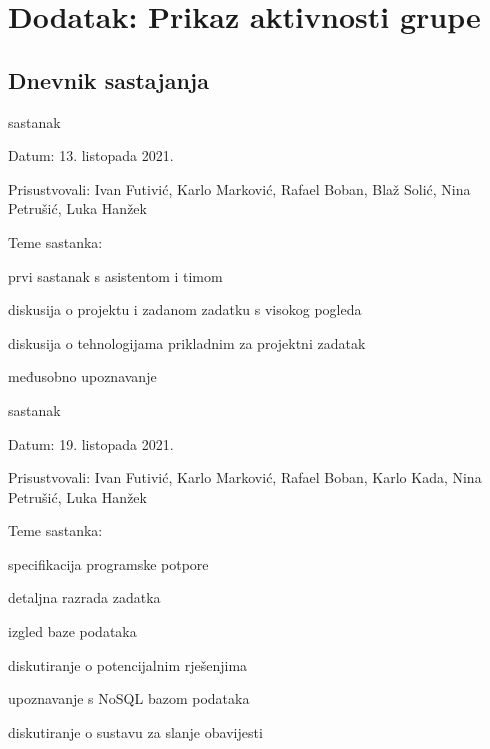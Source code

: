 \chapter*{Dodatak: Prikaz aktivnosti grupe}
		
		\section*{Dnevnik sastajanja}
		
		\begin{packed_enum}
			\item  sastanak
			
			\item[] \begin{packed_item}
				\item Datum: 13. listopada 2021.
				\item Prisustvovali: Ivan Futivić, Karlo Marković, Rafael Boban, Blaž Solić, Nina Petrušić, Luka Hanžek
				\item Teme sastanka:
				\begin{packed_item}
					\item  prvi sastanak s asistentom i timom
					\item  diskusija o projektu i zadanom zadatku s visokog pogleda
					\item  diskusija o tehnologijama prikladnim za projektni zadatak
					\item  međusobno upoznavanje
				\end{packed_item}
			\end{packed_item}
			
			\item  sastanak
			\item[] \begin{packed_item}
				\item Datum: 19. listopada 2021.
				\item Prisustvovali:  Ivan Futivić, Karlo Marković, Rafael Boban, Karlo Kada, Nina Petrušić, Luka Hanžek
				\item Teme sastanka:
				\begin{packed_item}
					\item  specifikacija programske potpore
					\item  detaljna razrada zadatka
					\item  izgled baze podataka
					\item  diskutiranje o potencijalnim rješenjima
					\item  upoznavanje s NoSQL bazom podataka
					\item  diskutiranje o sustavu za slanje obavijesti
				\end{packed_item}
			\end{packed_item}
			

\end{packed_enum}
